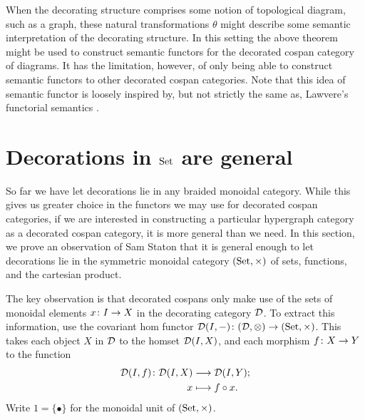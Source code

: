When the decorating structure comprises some notion of topological diagram, such
as a graph, these natural transformations $\theta$ might describe some semantic
interpretation of the decorating structure. In this setting the above theorem
might be used to construct semantic functors for the decorated cospan category
of diagrams. It has the limitation, however, of only being able to construct
semantic functors to other decorated cospan categories. Note that this idea of
semantic functor is loosely inspired by, but not strictly the same as, Lawvere's
functorial semantics \cite{Law}.

\section{Decorations in $\mathrm{Set}$ are general} \label{sec.setdecs}

So far we have let decorations lie in any braided monoidal category. While this
gives us greater choice in the functors we may use for decorated cospan
categories, if we are interested in constructing a particular hypergraph
category as a decorated cospan category, it is more general than we need. In
this section, we prove an observation of Sam Staton that it is general enough to
let decorations lie in the symmetric monoidal category $(\mathrm{Set},\times)$ of sets,
functions, and the cartesian product. 

The key observation is that decorated cospans only make use of the sets of
monoidal elements $x{\colon} I \to X$ in the decorating category $\mathcal D$. To
extract this information, use the covariant hom functor $\mathcal D(I,-){\colon} (\mathcal
D,\otimes) \to (\mathrm{Set},\times)$. This takes each object $X$ in $\mathcal D$ to the homset
$\mathcal D(I,X)$, and each morphism $f{\colon} X \to Y$ to the function 
\begin{align*}
  \mathcal D(I,f){\colon} \mathcal D(I,X) &\longrightarrow \mathcal D(I,Y); \\ 
  x &\longmapsto f \circ x.
\end{align*}
Write $1=\{\bullet\}$ for the monoidal unit of $(\mathrm{Set},\times)$.


